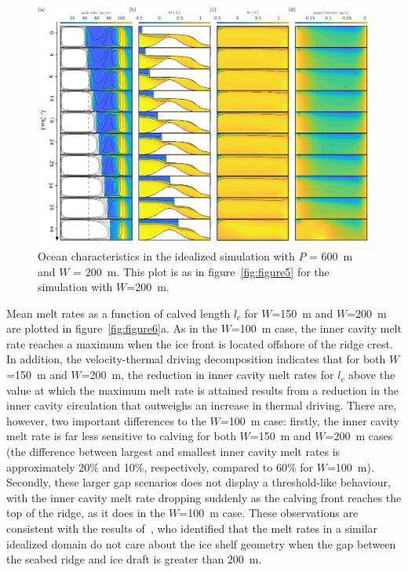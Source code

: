 \documentclass[draft]{agujournal2019}
\begin{document}
\begin{figure}
    \centering
    \includegraphics[width = \textwidth]{../make_figures/plots/figure7_axislabel.pdf}
    \caption{Ocean characteristics in the idealized simulation with $P$ = 600~m and $W$ = 200~m. This plot is as in figure~\ref{fig:figure5} for the simulation with $W$=200~m.}
    \label{fig:figure7}
\end{figure}


Mean melt rates as a function of calved length $l_c$ for $W$=150~m and $W$=200~m are plotted in figure~\ref{fig:figure6}a. As in the $W$=100~m case, the inner cavity melt rate reaches a maximum when the ice front is located offshore of the ridge crest. In addition, the velocity-thermal driving decomposition indicates that for both $W$=150~m and $W$=200~m, the reduction in inner cavity melt rates for $l_c$ above the value at which the maximum melt rate is attained results from a reduction in the inner cavity circulation that outweighs an increase in thermal driving. There are, however, two important differences to the $W$=100~m case: firstly, the inner cavity melt rate is far less sensitive to calving for both $W$=150~m and $W$=200~m cases (the difference between largest and smallest inner cavity melt rates is approximately 20\% and 10\%, respectively, compared to 60\% for $W$=100~m). Secondly, these larger gap scenarios does not display a threshold-like behaviour, with the inner cavity melt rate dropping suddenly as the calving front reaches the top of the ridge, as it does in the $W$=100~m case. These observations are consistent with the results of~, who identified that the melt rates in a similar idealized domain do not care about the ice shelf geometry when the gap between the seabed ridge and ice draft is greater than 200~m.
\end{document}

